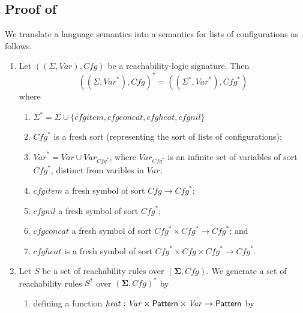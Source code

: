 \subsection{Proof of~}\label{app:CRLandRLcorrespondence}

\begin{definition}\label{def:starextension}
We translate a language semantics into a semantics for lists of configurations as follows.
\begin{enumerate}
    \item Let $((\Sigma, \mathit{Var}), \mathit{Cfg})$ be a reachability-logic signature.
          Then
          \begin{equation*}
            ((\Sigma, \mathit{Var}^*), \mathit{Cfg})^* = ((\Sigma^*, \mathit{Var}^*), \mathit{Cfg}^*)
          \end{equation*}
          where
          \begin{enumerate}
              \item $\Sigma^* = \Sigma \cup \{ \mathit{cfgitem}, \mathit{cfgconcat}, \mathit{cfgheat}, \mathit{cfgnil} \}$
              \item $\mathit{Cfg}^*$ is a fresh sort (representing the sort of lists of configurations);
              \item $\mathit{Var}^* = \mathit{Var} \cup \mathit{Var}_{\mathit{Cfg}^*}$,
              where $\mathit{Var}_{\mathit{Cfg}^*}$ is an infinite set of variables of sort $\mathit{Cfg}^*$,
              distinct from varibles in $\mathit{Var}$;
              \item $\mathit{cfgitem}$ a fresh symbol of sort $\mathit{Cfg} \to \mathit{Cfg}^*$;
              \item $\mathit{cfgnil}$ a fresh symbol of sort $\mathit{Cfg}^*$;
              \item $\mathit{cfgconcat}$ a fresh symbol of sort $\mathit{Cfg}^* \times \mathit{Cfg}^* \to \mathit{Cfg}^*$; and
              \item $\mathit{cfgheat}$ is a fresh symbol of sort $\mathit{Cfg}^* \times \mathit{Cfg} \times \mathit{Cfg}^* \to \mathit{Cfg}^*$.
          \end{enumerate}
    \item Let $S$ be a set of reachability rules over $(\mathbf{\Sigma}, \mathit{Cfg})$.
          We generate a set of reachability rules $S^*$ over $(\mathbf{\Sigma}, \mathit{Cfg})^*$
          by
          \begin{enumerate}
              \item defining a function $\mathit{heat} : \mathit{Var} \times \mathsf{Pattern} \times \mathit{Var} \to \mathsf{Pattern}$ by

\end{enumerate}
\end{enumerate}
\end{definition}
